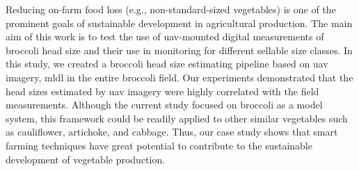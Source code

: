 Reducing on-farm food loss (e.g., non-standard-sized vegetables) is one of the prominent goals of sustainable development in agricultural production. The main aim of this work is to test the use of \gls{uav}-mounted digital measurements of broccoli head size and their use in monitoring for different sellable size classes. In this study, we created a broccoli head size estimating pipeline based on \gls{uav} imagery, \gls{mldl} in the entire broccoli field. Our experiments demonstrated that the head sizes estimated by \gls{uav} imagery were highly correlated with the field measurements. Although the current study focused on broccoli as a model system, this framework could be readily applied to other similar vegetables such as cauliflower, artichoke, and cabbage. Thus, our case study shows that smart farming techniques have great potential to contribute to the sustainable development of vegetable production.


